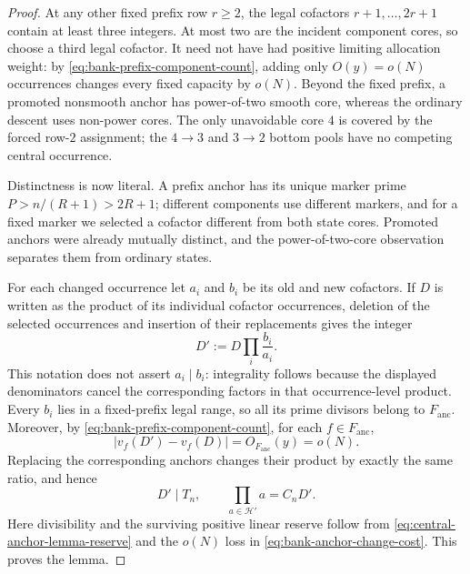 \documentclass[11pt]{article}
\numberwithin{equation}{section}
\theoremstyle{definition}
\theoremstyle{remark}
\newcommand{\1}{\mathbf 1}
\begin{document}
\begin{proof}
At any other fixed prefix row \(r\ge2\), the legal cofactors
\(r+1,\ldots,2r+1\) contain at least three integers.  At most two are the
incident component cores, so choose a third legal cofactor.  It need not
have had positive limiting allocation weight: by
\eqref{eq:bank-prefix-component-count}, adding only \(O(y)=o(N)\)
occurrences changes every fixed capacity by \(o(N)\).  Beyond the fixed
prefix, a promoted nonsmooth anchor has power-of-two smooth core, whereas
the ordinary descent uses non-power cores.  The only unavoidable core
\(4\) is covered by the forced row-\(2\) assignment; the \(4\to3\) and
\(3\to2\) bottom pools have no competing central occurrence.

Distinctness is now literal.  A prefix anchor has its unique marker
prime \(P>n/(R+1)>2R+1\); different components use different markers,
and for a fixed marker we selected a cofactor different from both state
cores.  Promoted anchors were already mutually distinct, and the
power-of-two-core observation separates them from ordinary states.

For each changed occurrence let \(a_i\) and \(b_i\) be its old and new
cofactors.  If \(D\) is written as the product of its individual cofactor
occurrences, deletion of the selected occurrences and insertion of their
replacements gives the integer
\begin{equation}
                         D':=D\prod_i\frac{b_i}{a_i}.
 \label{eq:bank-modified-divisor}
\end{equation}
This notation does not assert \(a_i\mid b_i\): integrality follows because
the displayed denominators cancel the corresponding factors in that
occurrence-level product.  Every \(b_i\) lies in a fixed-prefix legal
range, so all its prime divisors belong to \(F_{\mathrm{anc}}\).  Moreover,
by \eqref{eq:bank-prefix-component-count}, for each
\(f\in F_{\mathrm{anc}}\),
\begin{equation}
 |v_f(D')-v_f(D)|=O_{F_{\mathrm{anc}}}(y)=o(N).
 \label{eq:bank-anchor-change-cost}
\end{equation}
Replacing the corresponding anchors changes their product by exactly the
same ratio, and hence
\begin{equation}
 D'\mid T_n,\qquad
 \prod_{a\in\mathcal H'}a=C_nD'.
 \label{eq:bank-modified-anchor-identity}
\end{equation}
Here divisibility and the surviving positive linear reserve follow from
\eqref{eq:central-anchor-lemma-reserve} and the \(o(N)\) loss in
\eqref{eq:bank-anchor-change-cost}.  This proves the lemma.
\end{proof}
\end{document}
